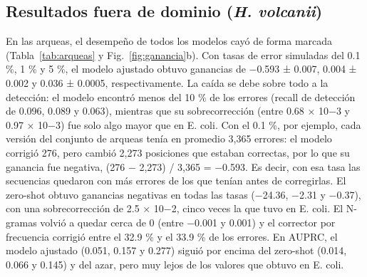 \documentclass[sigconf,nonacm]{acmart}
\begin{document}
\subsection{Resultados fuera de dominio (\emph{H. volcanii})}\label{sec:res-arqueas}

En las arqueas, el desempeño de todos los modelos cayó de forma marcada (Tabla~\ref{tab:arqueas} y Fig.~\ref{fig:ganancia}b). Con tasas de error simuladas del 0.1 \%, 1 \% y 5 \%, el modelo ajustado obtuvo ganancias de −0.593 ± 0.007, 0.004 ± 0.002 y 0.036 ± 0.0005, respectivamente. La caída se debe sobre todo a la detección: el modelo encontró menos del 10 \% de los errores (recall de detección de 0.096, 0.089 y 0.063), mientras que su sobrecorrección (entre 0.68 × 10−3 y 0.97 × 10−3) fue solo algo mayor que en E. coli. Con el 0.1 \%, por ejemplo, cada versión del conjunto de arqueas tenía en promedio 3,365 errores: el modelo corrigió 276, pero cambió 2,273 posiciones que estaban correctas, por lo que su ganancia fue negativa, (276 − 2,273) / 3,365 = −0.593. Es decir, con esa tasa las secuencias quedaron con más errores de los que tenían antes de corregirlas. El zero-shot obtuvo ganancias negativas en todas las tasas (−24.36, −2.31 y −0.37), con una sobrecorrección de 2.5 × 10−2, cinco veces la que tuvo en E. coli. El N-gramas volvió a quedar cerca de 0 (entre −0.001 y 0.001) y el corrector por frecuencia corrigió entre el 32.9 \% y el 33.9 \% de los errores. En AUPRC, el modelo ajustado (0.051, 0.157 y 0.277) siguió por encima del zero-shot (0.014, 0.066 y 0.145) y del azar, pero muy lejos de los valores que obtuvo en E. coli.
\end{document}
